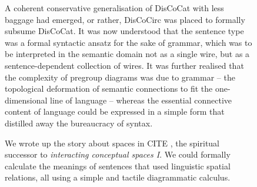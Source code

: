 \begin{figure}[h!]
\centering
{}
\caption{A coherent conservative generalisation of DisCoCat with less baggage had emerged, or rather, DisCoCirc was placed to formally subsume DisCoCat. It was now understood that the sentence type was a formal syntactic ansatz for the sake of grammar, which was to be interpreted in the semantic domain not as a single wire, but as a sentence-dependent collection of wires. It was further realised that the complexity of pregroup diagrams was due to grammar -- the topological deformation of semantic connections to fit the one-dimensional line of language -- whereas the essential connective content of language could be expressed in a simple form that distilled away the bureaucracy of syntax.}
\end{figure}

\begin{figure}[h!]
\centering
{}
\caption{We wrote up the story about spaces in \bR CITE \e, the spiritual successor to \emph{interacting conceptual spaces I}. We could formally calculate the meanings of sentences that used linguistic spatial relations, all using a simple and tactile diagrammatic calculus.}
\end{figure}

